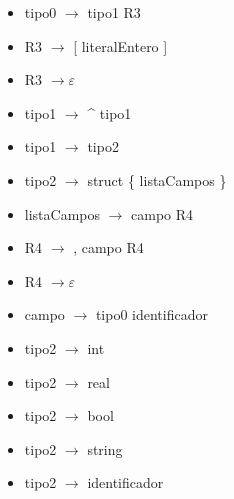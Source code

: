\documentclass[11pt]{article}
\begin{document}
        \begin{itemize}
            \item tipo0 $\rightarrow$ tipo1 R3
            \item R3 $\rightarrow$ [ literalEntero ]
            \item R3 $\rightarrow \varepsilon$
            \item tipo1 $\rightarrow$ \^{} tipo1
            \item tipo1 $\rightarrow$ tipo2
            \item tipo2 $\rightarrow$ struct \{ listaCampos \}
            \item listaCampos $\rightarrow$ campo R4
            \item R4 $\rightarrow$ , campo R4
            \item R4 $\rightarrow \varepsilon$
            \item campo $\rightarrow$ tipo0 identificador
            \item tipo2 $\rightarrow$ int
            \item tipo2 $\rightarrow$ real
            \item tipo2 $\rightarrow$ bool
            \item tipo2 $\rightarrow$ string
            \item tipo2 $\rightarrow$ identificador
        \end{itemize}
        \
\end{document}
